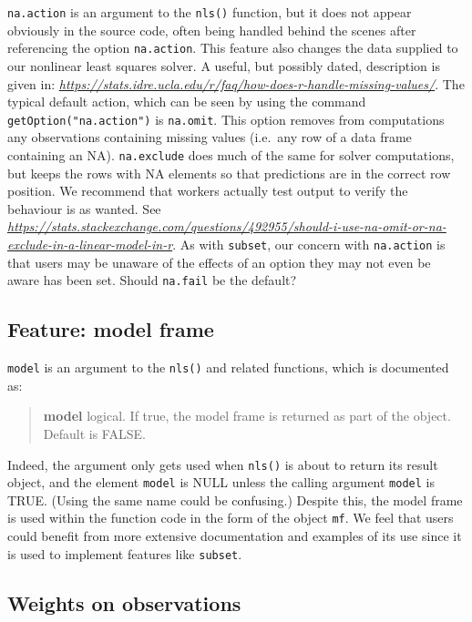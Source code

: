 \documentclass[
]{article}
\begin{document}
\texttt{na.action} is an argument to the \texttt{nls()} function, but it
does not appear obviously in the source code, often being handled behind
the scenes after referencing the option \texttt{na.action}. This feature
also changes the data supplied to our nonlinear least squares solver. A
useful, but possibly dated, description is given in:
\emph{\url{https://stats.idre.ucla.edu/r/faq/how-does-r-handle-missing-values/}}.
The typical default action, which can be seen by using the command
\texttt{getOption("na.action")} is \texttt{na.omit}. This option removes
from computations any observations containing missing values (i.e.~any
row of a data frame containing an NA). \texttt{na.exclude} does much of
the same for solver computations, but keeps the rows with NA elements so
that predictions are in the correct row position. We recommend that
workers actually test output to verify the behaviour is as wanted. See
\emph{\url{https://stats.stackexchange.com/questions/492955/should-i-use-na-omit-or-na-exclude-in-a-linear-model-in-r}}.
As with \texttt{subset}, our concern with \texttt{na.action} is that
users may be unaware of the effects of an option they may not even be
aware has been set. Should \texttt{na.fail} be the default?

\hypertarget{feature-model-frame}{%
\subsection{Feature: model frame}\label{feature-model-frame}}

\texttt{model} is an argument to the \texttt{nls()} and related
functions, which is documented as:

\begin{quote}
\textbf{model} logical. If true, the model frame is returned as part of
the object. Default is FALSE.
\end{quote}

Indeed, the argument only gets used when \texttt{nls()} is about to
return its result object, and the element \texttt{model} is NULL unless
the calling argument \texttt{model} is TRUE. (Using the same name could
be confusing.) Despite this, the model frame is used within the function
code in the form of the object \texttt{mf}. We feel that users could
benefit from more extensive documentation and examples of its use since
it is used to implement features like \texttt{subset}.

\hypertarget{weights-on-observations}{%
\subsection{Weights on observations}\label{weights-on-observations}}
\end{document}
